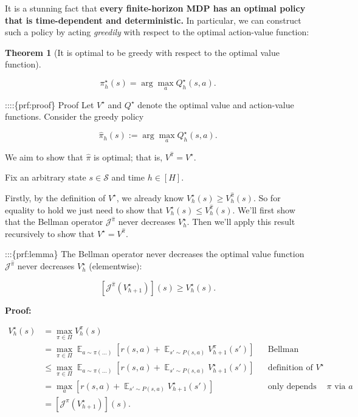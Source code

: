 \documentclass[
  letterpaper,
  DIV=11,
  numbers=noendperiod]{scrreprt}
\theoremstyle{plain}
\theoremstyle{plain}
\newtheorem{theorem}{Theorem}[chapter]
\theoremstyle{definition}
\theoremstyle{definition}
\theoremstyle{remark}
\begin{document}
It is a stunning fact that \textbf{every finite-horizon MDP has an
optimal policy that is time-dependent and deterministic.} In particular,
we can construct such a policy by acting \emph{greedily} with respect to
the optimal action-value function:

\begin{theorem}[It is optimal to be greedy with respect to the optimal
value
function]\protect\hypertarget{thm-optimal_greedy}{}\label{thm-optimal_greedy}

\[\pi_h^\star(s) = \arg\max_a Q_h^\star(s, a).\]

\end{theorem}

::::\{prf:proof\} Proof Let \(V^{\star}\) and \(Q^{\star}\) denote the
optimal value and action-value functions. Consider the greedy policy

\[\hat \pi_h(s) := \arg\max_a Q_h^{\star}(s, a).\]

We aim to show that \(\hat \pi\) is optimal; that is,
\(V^{\hat \pi} = V^{\star}\).

Fix an arbitrary state \(s \in \mathcal{S}\) and time \(h\in [H]\).

Firstly, by the definition of \(V^{\star}\), we already know
\(V_h^{\star}(s) \ge V_h^{\hat \pi}(s)\). So for equality to hold we
just need to show that \(V_h^{\star}(s) \le V_h^{\hat \pi}(s)\). We'll
first show that the Bellman operator \(\mathcal{J}^{\hat \pi}\) never
decreases \(V_h^{\star}\). Then we'll apply this result recursively to
show that \(V^{\star} = V^{\hat \pi}\).

:::\{prf:lemma\} The Bellman operator never decreases the optimal value
function \(\mathcal{J}^{\hat \pi}\) never decreases \(V_h^{\star}\)
(elementwise):

\[[\mathcal{J}^{\hat \pi} (V_{h+1}^{\star})](s) \ge V_h^{\star}(s).\]

\textbf{Proof:}

\[
\begin{aligned}
    V_h^{\star}(s) &= \max_{\pi \in \Pi} V_h^{\pi}(s) \\
    &= \max_{\pi \in \Pi} \mathop{\mathbb{E}}_{a \sim \pi(\dots)}\left[r(s, a) + \mathop{\mathbb{E}}_{s' \sim P(s, a)} V_{h+1}^\pi(s') \right] && \text{Bellman consistency} \\
    &\le \max_{\pi \in \Pi} \mathop{\mathbb{E}}_{a \sim \pi(\dots)}\left[r(s, a) + \mathop{\mathbb{E}}_{s' \sim P(s, a)} V_{h+1}^{\star}(s') \right] && \text{definition of } V^\star \\
    &= \max_{a} \left[ r(s, a) + \mathop{\mathbb{E}}_{s' \sim P(s, a)} V_{h+1}^{\star}(s') \right] && \text{only depends on } \pi \text{ via } a \\
    &= [\mathcal{J}^{\hat \pi}(V_{h+1}^{\star})](s).    
\end{aligned}
\]
\end{document}
